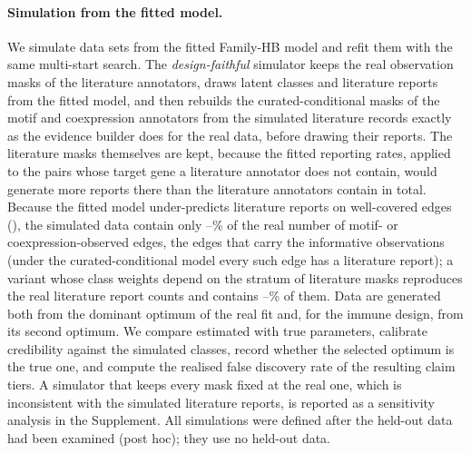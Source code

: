 \paragraph{Simulation from the fitted model.} We simulate data sets from the fitted Family-HB model and refit them with the same multi-start search. The \emph{design-faithful} simulator keeps the real observation masks of the literature annotators, draws latent classes and literature reports from the fitted model, and then rebuilds the curated-conditional masks of the motif and coexpression annotators from the simulated literature records exactly as the evidence builder does for the real data, before drawing their reports. The literature masks themselves are kept, because the fitted reporting rates, applied to the pairs whose target gene a literature annotator does not contain, would generate more reports there than the literature annotators contain in total. Because the fitted model under-predicts literature reports on well-covered edges (), the simulated data contain only \nSimInfoPctMin{}--\nSimInfoPctMax{}\% of the real number of motif- or coexpression-observed edges, the edges that carry the informative observations (under the curated-conditional model every such edge has a literature report); a variant whose class weights depend on the stratum of literature masks reproduces the real literature report counts and contains \nSimInfoStratPctMin{}--\nSimInfoStratPctMax{}\% of them. Data are generated both from the dominant optimum of the real fit and, for the immune design, from its second optimum. We compare estimated with true parameters, calibrate credibility against the simulated classes, record whether the selected optimum is the true one, and compute the realised false discovery rate of the resulting claim tiers. A simulator that keeps every mask fixed at the real one, which is inconsistent with the simulated literature reports, is reported as a sensitivity analysis in the Supplement. All simulations were defined after the held-out data had been examined (post hoc); they use no held-out data.

